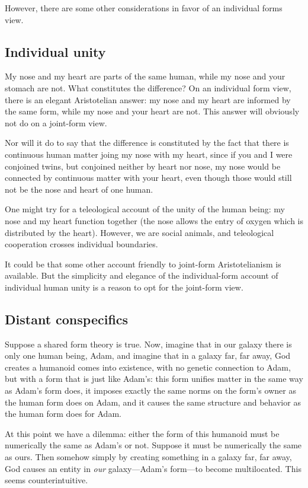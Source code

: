 However, there are some other considerations in favor of an individual forms view.

\subsection{Individual unity}
My nose and my heart are parts of the same human, while my nose and your stomach are not. What constitutes the 
difference? On an individual form view, there is an elegant Aristotelian answer: my nose and my heart are informed by the same
form, while my nose and your heart are not. This answer will obviously not do on a joint-form view.

Nor will it do to say that the difference is constituted by the fact that there is continuous human matter joing my nose with my
heart, since if you and I were conjoined twins, but conjoined neither by heart nor nose, my nose would be connected by continuous
matter with your heart, even though those would still not be the nose and heart of one human. 

One might try for a teleological account of the unity of the human being: my nose and my heart function together (the nose 
allows the entry of oxygen which is distributed by the heart). However, we are social animals, and teleological cooperation
crosses individual boundaries.

It could be that some other account friendly to joint-form Aristotelianism is available. But the simplicity and elegance of the
individual-form account of individual human unity is a reason to opt for the joint-form view.

\subsection{Distant conspecifics}
Suppose a shared form theory is true. Now, imagine that in our galaxy there is only one human being, Adam, and imagine that in 
a galaxy far, far away, God creates a humanoid comes into existence, with no genetic connection to Adam, but with a form that 
is just like Adam's: this form unifies matter in the same way as
Adam's form does, it imposes exactly the same norms on the form's owner as the human form does on Adam, and it causes the same
structure and behavior as the human form does for Adam. 

At this point we have a dilemma: either the form of this humanoid must be numerically the same as Adam's or not. Suppose it 
must be numerically the same as ours. Then somehow simply by creating something in a galaxy far, far away, God causes an
entity in \textit{our} galaxy---Adam's form---to become multilocated. This seems counterintuitive. 

